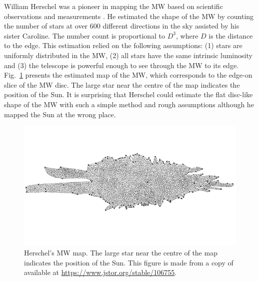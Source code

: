 William Herschel was a pioneer in mapping the \ac{MW} based on scientific observations and measurements \citep{1785RSPT...75..213H}. He estimated the shape of the \ac{MW} by counting the number of stars at over 600 different directions in the sky assisted by his sister Caroline. The number count is proportional to $D^3$, where $D$ is the distance to the edge. This estimation relied on the following assumptions: (1) stars are uniformly distributed in the \ac{MW}, (2) all stars have the same intrinsic luminosity and (3) the telescope is powerful enough to see through the \ac{MW} to its edge.
Fig.~\ref{fig:mw_herschel} presents the estimated map of the \ac{MW}, which corresponds to the edge-on slice of the \ac{MW} disc. The large star near the centre of the map indicates the position of the Sun.
It is surprising that Herschel could estimate the flat disc-like shape of the \ac{MW} with such a simple method and rough assumptions although he mapped the Sun at the wrong place.
\begin{figure}[t]
	\begin{center}
		\includegraphics[width=\linewidth, trim={0cm 1cm 0cm 1cm}]{figs/Herschel_MW.pdf}
		\caption[Herschel's MW map]{Herschel's \ac{MW} map. The large star near the centre of the map indicates the position of the Sun. This figure is made from a copy of \citet{1785RSPT...75..213H} available at \url{https://www.jstor.org/stable/106755}.}
		\label{fig:mw_herschel}
	\end{center}
\end{figure}

